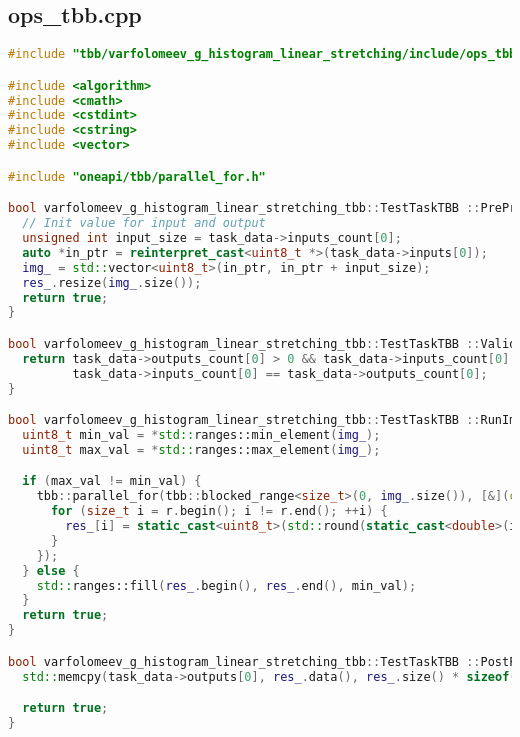 \documentclass[a4paper,12pt]{article}
\begin{document}
\subsection{ops\_tbb.cpp}
\begin{lstlisting}[language=C++,
    breaklines=true,       % Автоматический перенос строк
    basicstyle=\small\ttfamily, % Уменьшенный шрифт
    columns=fullflexible ]
   #include "tbb/varfolomeev_g_histogram_linear_stretching/include/ops_tbb.hpp"

#include <algorithm>
#include <cmath>
#include <cstdint>
#include <cstring>
#include <vector>

#include "oneapi/tbb/parallel_for.h"

bool varfolomeev_g_histogram_linear_stretching_tbb::TestTaskTBB ::PreProcessingImpl() {
  // Init value for input and output
  unsigned int input_size = task_data->inputs_count[0];
  auto *in_ptr = reinterpret_cast<uint8_t *>(task_data->inputs[0]);
  img_ = std::vector<uint8_t>(in_ptr, in_ptr + input_size);
  res_.resize(img_.size());
  return true;
}

bool varfolomeev_g_histogram_linear_stretching_tbb::TestTaskTBB ::ValidationImpl() {
  return task_data->outputs_count[0] > 0 && task_data->inputs_count[0] > 0 &&
         task_data->inputs_count[0] == task_data->outputs_count[0];
}

bool varfolomeev_g_histogram_linear_stretching_tbb::TestTaskTBB ::RunImpl() {
  uint8_t min_val = *std::ranges::min_element(img_);
  uint8_t max_val = *std::ranges::max_element(img_);

  if (max_val != min_val) {
    tbb::parallel_for(tbb::blocked_range<size_t>(0, img_.size()), [&](const tbb::blocked_range<size_t> &r) {
      for (size_t i = r.begin(); i != r.end(); ++i) {
        res_[i] = static_cast<uint8_t>(std::round(static_cast<double>(img_[i] - min_val) * 255 / (max_val - min_val)));
      }
    });
  } else {
    std::ranges::fill(res_.begin(), res_.end(), min_val);
  }
  return true;
}

bool varfolomeev_g_histogram_linear_stretching_tbb::TestTaskTBB ::PostProcessingImpl() {
  std::memcpy(task_data->outputs[0], res_.data(), res_.size() * sizeof(uint8_t));

  return true;
}
    \end{lstlisting}
\end{document}
